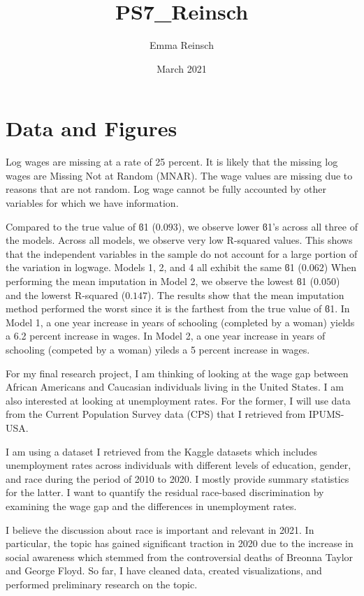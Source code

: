 \documentclass{article}
\title{PS7_Reinsch}
\author{Emma Reinsch}
\date{March 2021}
\begin{document}
\section{Data and Figures}


Log wages are missing at a rate of 25 percent. It is likely that the missing log wages are Missing Not at Random (MNAR). The wage values are missing due to reasons that are not random. Log wage cannot be fully accounted by other variables for which we have information.


Compared to the true value of ϐ1 ($0.093$), we observe lower ϐ1's across all three of the models. Across all models, we observe very low R-squared values. This shows that the independent variables in the sample do not account for a large portion of the variation in logwage. Models 1, 2, and 4 all exhibit the same ϐ1 ($0.062$) When performing the mean imputation in Model 2, we observe the lowest ϐ1 ($0.050$) and the lowerst R-squared ($0.147$). The results show that the mean imputation method performed the worst since it is the farthest from the true value of ϐ1. 
In Model 1, a one year increase in years of schooling (completed by a woman) yields a 6.2 percent increase in wages.
In Model 2, a one year increase in years of schooling (competed by a woman) yileds a 5 percent increase in wages.



For my final research project, I am thinking of looking at the wage gap between African Americans and Caucasian individuals living in the United States. I am also interested at looking at unemployment rates. For the former, I will use data from the Current Population Survey data (CPS) that I retrieved from IPUMS-USA.  

I am using a dataset I retrieved from the Kaggle datasets which includes unemployment rates across individuals with different levels of education, gender, and race during the period of 2010 to 2020. I mostly provide summary statistics for the latter. I want to quantify the residual race-based discrimination by examining the wage gap and the differences in unemployment rates.

I believe the discussion about race is important and relevant in 2021. In particular, the topic has gained significant traction in 2020 due to the increase in social awareness which stemmed from the controversial deaths of Breonna Taylor and George Floyd. So far, I have cleaned data, created visualizations, and performed preliminary research on the topic.
\end{document}
